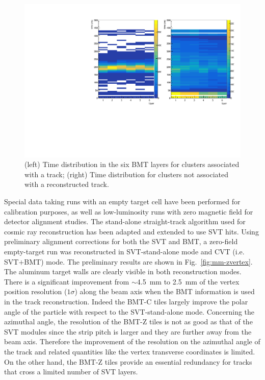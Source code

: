 \begin{figure}[htb]
 \includegraphics[width=\columnwidth,keepaspectratio]{images/align_cls_time.pdf}
 \caption{(left) Time distribution in the six BMT layers for clusters associated with a track; (right) Time distribution for
   clusters not associated with a reconstructed track.}
 \label{fig:mm-beam_cls_time}
\end{figure}

Special data taking runs with an empty target cell have been performed for calibration purposes, as well as low-luminosity
runs with zero magnetic field for detector alignment studies. The stand-alone straight-track algorithm used for cosmic
ray reconstruction has been adapted and extended to use SVT hits. Using preliminary alignment corrections for both the
SVT and BMT, a zero-field empty-target run was reconstructed in SVT-stand-alone mode and CVT (i.e. SVT$+$BMT)
mode. The preliminary results are shown in Fig.~\ref{fig:mm-zvertex}. The aluminum target walls are clearly visible in
both reconstruction modes. There is a significant improvement from $\sim$4.5~mm to 2.5~mm of the vertex position
resolution ($1\sigma$) along the beam axis when the BMT information is used in the track reconstruction. Indeed the
BMT-C tiles largely improve the polar angle of the particle with respect to the SVT-stand-alone mode. Concerning the
azimuthal angle, the resolution of the BMT-Z tiles is not as good as that of the SVT modules since the strip pitch is larger
and they are further away from the beam axis. Therefore the improvement of the resolution on the azimuthal angle of the
track and related quantities like the vertex transverse coordinates is limited. On the other hand, the BMT-Z tiles provide
an essential redundancy for tracks that cross a limited number of SVT layers.

